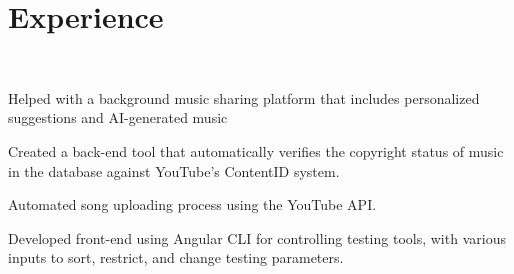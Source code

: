 \documentclass[]{deedy-resume-openfont}
\begin{document}
\begin{minipage}[t]{0.66\textwidth} 


\section{Experience}
\begin{comment}
\runsubsection{IMPD}
\descript{| Intern }
\location{September 2018 - Present | Berkeley, CA}
\begin{tightemize}
\vspace{\topsep}
\item Worked on Project ATMA (Artificial Tragedy Monitor and Autoresponder), an artificial intelligence platform that can recognize emergency situations and automatically call 911 through real-time analysis of video footage. 
\item Found and input videos to train the platform to recognize emergency and distress signals in video footage.
\item Building a Deep Neural Network with Keras API.
\end{tightemize}
\sectionsep
\end{comment}

\vspace{\topsep} %
\\
\sectionsep

\vspace{\topsep} %
\begin{tightemize}
\item Helped with a background music sharing platform that includes personalized suggestions and AI-generated music
\item Created a back-end tool that automatically verifies the copyright status of music in the database against YouTube's ContentID system.
\item Automated song uploading process using the YouTube API.
\item Developed front-end using Angular CLI for controlling testing tools, with various inputs to sort, restrict, and change testing parameters.
\end{tightemize}
\sectionsep


\end{minipage}
\end{document}
